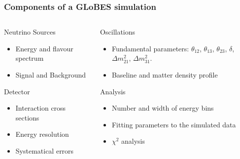 \documentclass{beamer}
\begin{document}
\begin{frame}
  \frametitle{Components of a GLoBES simulation}

  \begin{columns}
    \begin{column}{5.5 cm}
      \begin{block}{Neutrino Sources}
        \parbox[t][2.6 cm]{5.2 cm}{  
        \begin{itemize}
          \item Energy and flavour spectrum
          \item Signal and Background
        \end{itemize}}
      \end{block}
      \begin{block}{Detector}
        \parbox[t][2.7 cm]{5.2 cm}{  
        \begin{itemize}
          \item Interaction cross sections
          \item Energy resolution
          \item Systematical errors
        \end{itemize}}
      \end{block}
    \end{column}
    \begin{column}{5.5 cm}
      \begin{block}{Oscillations}
        \parbox[t][2.6 cm]{5.2 cm}{  
        \begin{itemize}
          \item Fundamental parameters: $\theta_{12}$, $\theta_{13}$, $\theta_{23}$,
                $\delta$, $\Delta m_{21}^2$, $\Delta m_{31}^2$.
          \item Baseline and matter density profile
        \end{itemize}}
      \end{block}
      \begin{block}{Analysis}
        \parbox[t][2.7 cm]{5.2 cm}{  
        \begin{itemize}
          \item Number and width of energy bins
          \item Fitting parameters to the simulated data
          \item $\chi^2$ analysis
        \end{itemize}}
      \end{block}
    \end{column}
  \end{columns}
\end{frame}
\end{document}
